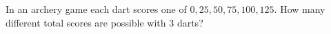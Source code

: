 In an archery game each dart scores one of $0,25,50,75,100,125$. How many different total scores are possible with $3$ darts?
